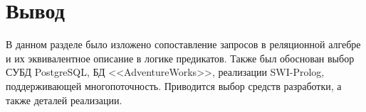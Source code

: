 \section*{Вывод}
\vspace{-0.5cm}
В данном разделе было изложено сопоставление запросов в реляционной алгебре и их эквивалентное описание в логике предикатов. Также был обоснован выбор СУБД PostgreSQL, БД <<AdventureWorks>>, реализации SWI-Prolog, поддерживающей многопоточность. Приводится выбор средств разработки, а также деталей реализации.